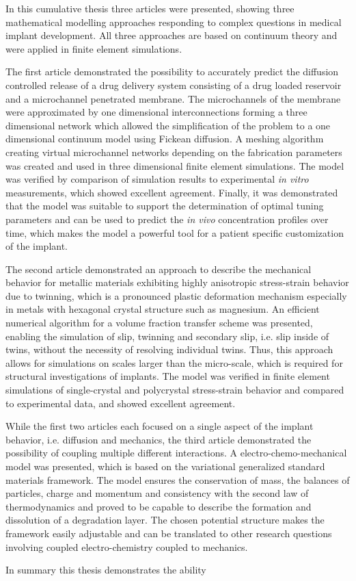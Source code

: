 In this cumulative thesis three articles were presented, showing three mathematical modelling approaches responding to complex questions in medical implant development. All three approaches are based on continuum theory and were applied in finite element simulations. 

The first article demonstrated the possibility to accurately predict the diffusion controlled release of a drug delivery system consisting of a drug loaded reservoir and a microchannel penetrated membrane. The microchannels of the membrane were approximated by one dimensional interconnections forming a three dimensional network which allowed the simplification of the problem to a one dimensional continuum model using Fickean diffusion. A meshing algorithm creating virtual microchannel networks depending on the fabrication parameters was created and used in three dimensional finite element simulations. The model was verified by comparison of simulation results to experimental \textit{in vitro} measurements, which showed excellent agreement. Finally, it was demonstrated that the model was suitable to support the determination of optimal tuning parameters and can be used to predict the \textit{in vivo} concentration profiles over time, which makes the model a powerful tool for a patient specific customization of the implant.

The second article demonstrated an approach to describe the mechanical behavior for metallic materials exhibiting highly anisotropic stress-strain behavior due to twinning, which is a pronounced plastic deformation mechanism especially in metals with hexagonal crystal structure such as magnesium. An efficient numerical algorithm for a volume fraction transfer scheme was presented, enabling the simulation of slip, twinning and secondary slip, i.e. slip inside of twins, without the necessity of resolving individual twins. Thus, this approach allows for simulations on scales larger than the micro-scale, which is required for structural investigations of implants. The model was verified in finite element simulations of single-crystal and polycrystal stress-strain behavior and compared to experimental data, and showed excellent agreement.  

While the first two articles each focused on a single aspect of the implant behavior, i.e. diffusion and mechanics, the third article demonstrated the possibility of coupling multiple different interactions. A electro-chemo-mechanical model was presented, which is based on the variational generalized standard materials framework. The model ensures the conservation of mass, the balances of particles, charge and momentum and consistency with the second law of thermodynamics and proved to be capable to describe the formation and dissolution of a degradation layer. The chosen potential structure makes the framework easily adjustable and can be translated to other research questions involving coupled electro-chemistry coupled to mechanics. 

In summary this thesis demonstrates the ability  